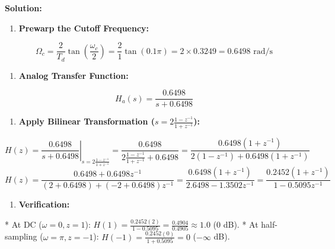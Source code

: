 \documentclass[11pt,a4paper]{article}
\begin{document}
\textbf{Solution:}
\begin{enumerate}
\item \textbf{Prewarp the Cutoff Frequency:}
\end{enumerate}
   $$ \Omega_c = \frac{2}{T_d} \tan\left( \frac{\omega_c}{2} \right) = \frac{2}{1} \tan(0.1\pi) = 2 \times 0.3249 = 0.6498 \text{ rad/s} $$
\begin{enumerate}
\item \textbf{Analog Transfer Function:}
\end{enumerate}
   $$ H_a(s) = \frac{0.6498}{s + 0.6498} $$
\begin{enumerate}
\item \textbf{Apply Bilinear Transformation ($s = 2 \frac{1 - z^{-1}}{1 + z^{-1}}$):}
\end{enumerate}
   $$ H(z) = \left. \frac{0.6498}{s + 0.6498} \right|_{s = 2 \frac{1 - z^{-1}}{1 + z^{-1}}} = \frac{0.6498}{2 \frac{1 - z^{-1}}{1 + z^{-1}} + 0.6498} = \frac{0.6498(1 + z^{-1})}{2(1 - z^{-1}) + 0.6498(1 + z^{-1})} $$
   $$ H(z) = \frac{0.6498 + 0.6498 z^{-1}}{(2 + 0.6498) + (-2 + 0.6498) z^{-1}} = \frac{0.6498(1 + z^{-1})}{2.6498 - 1.3502 z^{-1}} = \frac{0.2452(1 + z^{-1})}{1 - 0.5095 z^{-1}} $$
\begin{enumerate}
\item \textbf{Verification:}
\end{enumerate}
   * At DC ($\omega = 0, z = 1$): $H(1) = \frac{0.2452(2)}{1 - 0.5095} = \frac{0.4904}{0.4905} \approx 1.0$ (0 dB).
   * At half-sampling ($\omega = \pi, z = -1$): $H(-1) = \frac{0.2452(0)}{1 + 0.5095} = 0$ ($-\infty$ dB).
\end{document}
